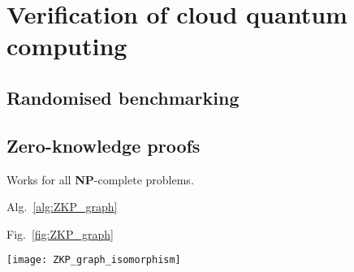 %
%

\section{Verification of cloud quantum computing} \label{sec:verification}

\subsection{Randomised benchmarking}\label{sec:rand_bench}


\subsection{Zero-knowledge proofs}\label{sec:ZKP}

Works for all \textbf{NP}-complete problems.

Alg.~\ref{alg:ZKP_graph}

Fig.~\ref{fig:ZKP_graph}

\begin{figure*}[!htpb]
	\texttt{[image: ZKP\_graph\_isomorphism]}
\captionspacefig \caption{The isomorphisms \mbox{$G_1\sim H$} and \mbox{$G_2\sim H$}. Knowing both isomorphisms simultaneously implies knowledge of \mbox{$G_1\sim G_2$} via composition of the permutations. However, knowing only one of them does not, since $H$ is chosen randomly. By repeatedly proving knowledge of one of the former, chosen at random, we achieve asymptotic certainty that the prover must have known \mbox{$G_1\sim G_2$}, without actually revealing it.}\label{fig:ZKP_graph}
\end{figure*}

